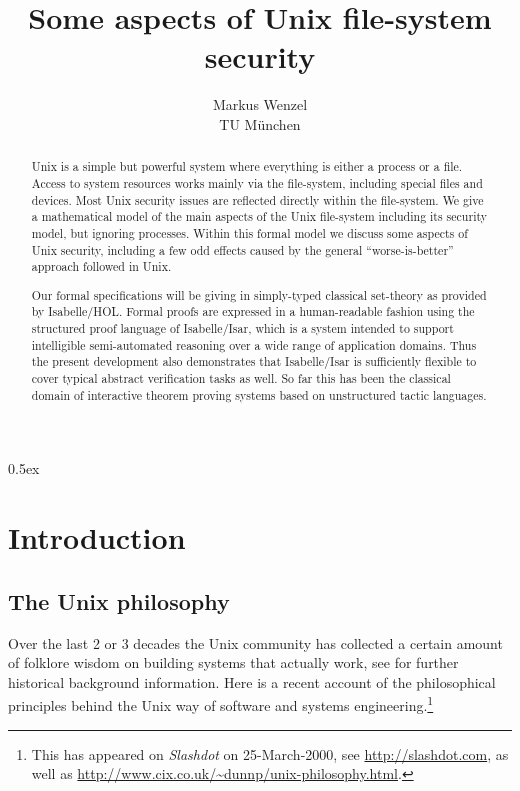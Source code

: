 \documentclass[11pt,a4paper]{article}
\begin{document}
\title{Some aspects of Unix file-system security}
\author{Markus Wenzel \\ TU M\"unchen}
\maketitle

\begin{abstract}
  Unix is a simple but powerful system where everything is either a process or
  a file.  Access to system resources works mainly via the file-system,
  including special files and devices.  Most Unix security issues are
  reflected directly within the file-system.  We give a mathematical model of
  the main aspects of the Unix file-system including its security model, but
  ignoring processes.  Within this formal model we discuss some aspects of
  Unix security, including a few odd effects caused by the general
  ``worse-is-better'' approach followed in Unix.
  
  Our formal specifications will be giving in simply-typed classical
  set-theory as provided by Isabelle/HOL.  Formal proofs are expressed in a
  human-readable fashion using the structured proof language of Isabelle/Isar,
  which is a system intended to support intelligible semi-automated reasoning
  over a wide range of application domains.  Thus the present development also
  demonstrates that Isabelle/Isar is sufficiently flexible to cover typical
  abstract verification tasks as well.  So far this has been the classical
  domain of interactive theorem proving systems based on unstructured tactic
  languages.
\end{abstract}

\tableofcontents
\newpage

\parindent 0pt\parskip 0.5ex


\section{Introduction}\label{sec:unix-intro}

\subsection{The Unix philosophy}

Over the last 2 or 3 decades the Unix community has collected a certain amount
of folklore wisdom on building systems that actually work, see
\cite{Unix-heritage} for further historical background information.  Here is a
recent account of the philosophical principles behind the Unix way of software
and systems engineering.\footnote{This has appeared on \emph{Slashdot} on
  25-March-2000, see \url{http://slashdot.com}, as well as
  \url{http://www.cix.co.uk/~dunnp/unix-philosophy.html}.}
\end{document}
